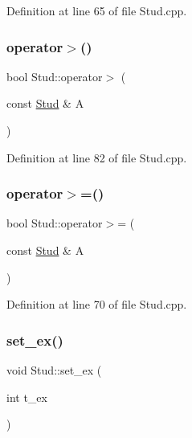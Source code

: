 Definition at line 65 of file Stud.\+cpp.

\mbox{\label{class_stud_a36be89d64a926e7ef2e5c07f97364998}} 
\subsubsection{\texorpdfstring{operator$>$()}{operator>()}}
{\footnotesize\ttfamily bool Stud\+::operator$>$ (\begin{DoxyParamCaption}\item[{const \mbox{\hyperlink{class_stud}{Stud}} \&}]{A }\end{DoxyParamCaption})}



Definition at line 82 of file Stud.\+cpp.

\mbox{\label{class_stud_a1d5e445949cab995194094100f7ead13}} 
\subsubsection{\texorpdfstring{operator$>$=()}{operator>=()}}
{\footnotesize\ttfamily bool Stud\+::operator$>$= (\begin{DoxyParamCaption}\item[{const \mbox{\hyperlink{class_stud}{Stud}} \&}]{A }\end{DoxyParamCaption})}



Definition at line 70 of file Stud.\+cpp.

\mbox{\label{class_stud_a5a781181ed2031623963880d294066f2}} 
\subsubsection{\texorpdfstring{set\_ex()}{set\_ex()}\hspace{0.1cm}{\footnotesize\ttfamily [1/2]}}
{\footnotesize\ttfamily void Stud\+::set\+\_\+ex (\begin{DoxyParamCaption}\item[{int}]{t\+\_\+ex }\end{DoxyParamCaption})\hspace{0.3cm}{\ttfamily [inline]}}



